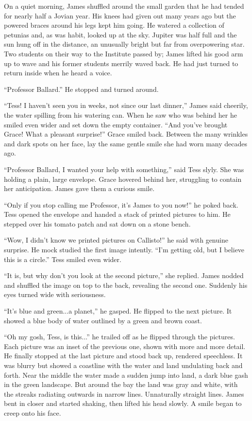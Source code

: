 \documentclass[12pt]{article} %
\begin{document}
On a quiet morning, James shuffled around the small garden that he had tended for nearly half a Jovian year. His knees had given out many years ago but the powered braces around his legs kept him going. He watered a collection of petunias and, as was habit, looked up at the sky. Jupiter was half full and the sun hung off in the distance, an unusually bright but far from overpowering star. Two students on their way to the Institute passed by; James lifted his good arm up to wave and his former students merrily waved back. He had just turned to return inside when he heard a voice.

``Professor Ballard.'' He stopped and turned around.

``Tess! I haven't seen you in weeks, not since our last dinner,'' James said cheerily, the water spilling from his watering can. When he saw who was behind her he smiled even wider and set down the empty container. ``And you've brought Grace! What a pleasant surprise!'' Grace smiled back. Between the many wrinkles and dark spots on her face, lay the same gentle smile she had worn many decades ago. 

``Professor Ballard, I wanted your help with something,'' said Tess slyly. She was holding a plain, large envelope. Grace hovered behind her, struggling to contain her anticipation. James gave them a curious smile.

``Only if you stop calling me Professor, it's James to you now!'' he poked back. Tess opened the envelope and handed a stack of printed pictures to him. He stepped over his tomato patch and sat down on a stone bench.

``Wow, I didn't know we printed pictures on Callisto!'' he said with genuine surprise. He mock studied the first image intently. ``I'm getting old, but I believe this is a circle.'' Tess smiled even wider.

``It is, but why don't you look at the second picture,'' she replied. James nodded and shuffled the image on top to the back, revealing the second one. Suddenly his eyes turned wide with seriousness.

``It's blue and green...a planet,'' he gasped. He flipped to the next picture. It showed a blue body of water outlined by a green and brown coast.

``Oh my gosh, Tess, is this...'' he trailed off as he flipped through the pictures. Each picture was an inset of the previous one, shown with more and more detail. He finally stopped at the last picture and stood back up, rendered speechless. It was blurry but showed a coastline with the water and land undulating back and forth. Near the middle the water made a sudden jump into land, a dark blue gash in the green landscape. But around the bay the land was gray and white, with the streaks radiating outwards in narrow lines. Unnaturally straight lines. James bent in closer and started shaking, then lifted his head slowly. A smile began to creep onto his face.
\end{document}
